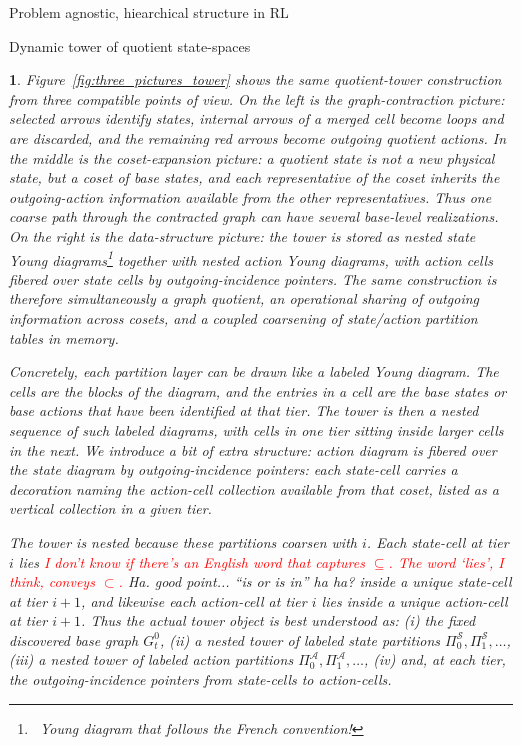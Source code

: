 \documentclass[11pt]{article}
\newtheorem{ermark}[subsubsection]{}
\begin{document}
\begin{section}{Problem agnostic, hiearchical structure in RL}
\begin{subsection}{Dynamic tower of quotient state-spaces}
\begin{ermark}
Figure~\ref{fig:three_pictures_tower} shows the same quotient-tower construction from three compatible points of view. On the left is the graph-contraction picture: selected arrows identify states, internal arrows of a merged cell become loops and are discarded, and the remaining red arrows become outgoing quotient actions. In the middle is the coset-expansion picture: a quotient state is not a new physical state, but a coset of base states, and each representative of the coset inherits the outgoing-action information available from the other representatives. Thus one coarse path through the contracted graph can have several base-level realizations. On the right is the data-structure picture: the tower is stored as nested state Young \cite{YoungTab} diagrams\footnote{\ Young diagram that follows the French convention!} together with nested action Young diagrams, with action cells fibered over state cells by outgoing-incidence pointers. The same construction is therefore simultaneously a graph quotient, an operational sharing of outgoing information across cosets, and a coupled coarsening of state/action partition tables in memory.

Concretely, each partition layer can be drawn like a labeled Young diagram. The cells are the blocks of the diagram, and the entries in a cell are the base states or base actions that have been identified at that tier. The tower is then a nested sequence of such labeled diagrams, with cells in one tier sitting inside larger cells in the next. We introduce a bit of extra structure: action diagram is fibered over the state diagram by outgoing-incidence pointers: each state-cell carries a decoration naming the action-cell collection available from that coset, listed as a vertical collection in a given tier.

The tower is nested because these partitions coarsen with $i$. Each state-cell at tier $i$ lies \textcolor{red}{I don't know if there's an English word that captures $\subseteq$. The word `lies', I think, conveys $\subset$.} {\color{blue} Ha. good point... ``is or is in'' ha ha?} inside a unique state-cell at tier $i+1$, and likewise each action-cell at tier $i$ lies inside a unique action-cell at tier $i+1$. Thus the actual tower object is best understood as: (i) the fixed discovered base graph $G_t^0$, (ii) a nested tower of labeled state partitions $\Pi_0^{\mathcal S},\Pi_1^{\mathcal S},\dots$, (iii) a nested tower of labeled action partitions $\Pi_0^{\mathcal A},\Pi_1^{\mathcal A},\dots$, (iv) and, at each tier, the outgoing-incidence pointers from state-cells to action-cells.


\end{ermark}
\end{subsection}
\end{section}
\end{document}
